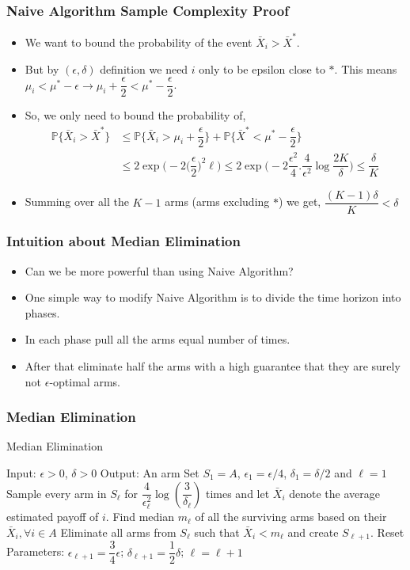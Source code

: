 \begin{frame}
\frametitle{Naive Algorithm Sample Complexity Proof}
\begin{itemize}
\item<1-> We want to bound the probability of the event $\bar{X}_i > \bar{X}^* $.
\item<2-> But by $(\epsilon,\delta)$ definition we need $i$ only to be epsilon close to $*$. This means $\mu_i<\mu^* - \epsilon \rightarrow \mu_i + \dfrac{\epsilon}{2} <\mu^* - \dfrac{\epsilon}{2}$.
\item<3-> So, we only need to bound the probability of, 
\begin{align*}
\mathbb{P}\lbrace\bar{X}_i > \bar{X}^* \rbrace &\leq \mathbb{P}\bigg\lbrace \bar{X}_i > \mu_i + \dfrac{\epsilon}{2}\bigg\rbrace + \mathbb{P}\bigg\lbrace \bar{X}^* < \mu^* - \dfrac{\epsilon}{2}\bigg\rbrace\\
&\leq 2\exp\bigg(-2\big (\dfrac{\epsilon}{2}\big)^{2}\ell\bigg)\leq 2\exp\bigg(-2\dfrac{\epsilon^2}{4}. \dfrac{4}{\epsilon^{2}}\log \dfrac{2K}{\delta} \bigg)\leq \dfrac{\delta}{K}
\end{align*}
\item<4-> Summing over all the $K-1$ arms (arms excluding $*$) we get, $\dfrac{(K-1)\delta}{K}< \delta$
\end{itemize}
\end{frame}

\begin{frame}
\frametitle{Intuition about Median Elimination}
\begin{itemize}
\item<1-> Can we be more powerful than using Naive Algorithm?
\item<2-> One simple way to modify Naive Algorithm is to divide the time horizon into phases.
\item<3-> In each phase pull all the arms equal number of times.
\item<4-> After that eliminate half the arms with a high guarantee that they are surely not $\epsilon$-optimal arms.
\end{itemize}
\end{frame}

\begin{frame}
\frametitle{Median Elimination}
\begin{algorithm}[H]
\caption{Median Elimination}
\begin{algorithmic}[1]
\State Input: $\epsilon > 0$, $\delta > 0$
\State Output: An arm  
\State Set $S_1 =A$, $\epsilon_1 = \epsilon/4$, $\delta_1=\delta/2$ and $\ell=1$
\State Sample every arm in $S_\ell$ for $\dfrac{4}{\epsilon_{\ell}^{2}}\log(\dfrac{3}{\delta_\ell})$ times and let $\bar{X}_i$ denote the average estimated payoff of $i$.
\State Find median $m_{\ell}$ of all the surviving arms based on their $\bar{X}_{i},\forall i\in A$
\State Eliminate all arms from $S_{\ell}$ such that $\bar{X}_{i}< m_{\ell}$ and create $S_{\ell+1}$.
\State Reset Parameters: $\epsilon_{\ell+1}=\dfrac{3}{4}\epsilon$; $\delta_{\ell+1}=\dfrac{1}{2}\delta$; $\ell=\ell+1$
\EndFor
\end{algorithmic}
\end{algorithm}
\cite{even2006action}
\end{frame}

